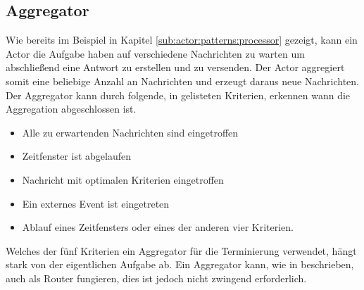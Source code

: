 \subsection{Aggregator}\label{sec:actor:patterns:aggregator}
Wie bereits im Beispiel in Kapitel \ref{sub:actor:patterns:processor} gezeigt, kann ein Actor die Aufgabe haben auf verschiedene Nachrichten zu warten um abschließend eine Antwort zu erstellen und zu versenden. Der Actor aggregiert somit eine beliebige Anzahl an Nachrichten und erzeugt daraus neue Nachrichten. \\
Der Aggregator kann durch folgende, in \cite{Vernon2015ReactiveAkka} gelisteten Kriterien, erkennen wann die Aggregation abgeschlossen ist.
\begin{itemize}
  \item Alle zu erwartenden Nachrichten sind eingetroffen
  \item Zeitfenster ist abgelaufen
  \item Nachricht mit optimalen Kriterien eingetroffen
  \item Ein externes Event ist eingetreten
  \item Ablauf eines Zeitfensters oder eines der anderen vier Kriterien.
\end{itemize}
Welches der fünf Kriterien ein Aggregator für die Terminierung verwendet, hängt stark von der eigentlichen Aufgabe ab. Ein Aggregator kann, wie in \cite{Vernon2015ReactiveAkka} beschrieben, auch als Router fungieren, dies ist jedoch nicht zwingend erforderlich.

